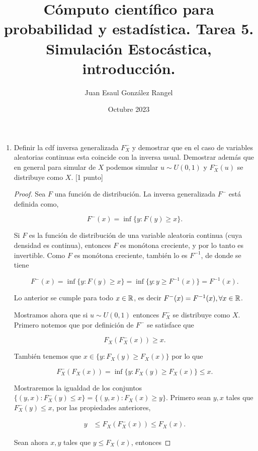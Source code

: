 \documentclass{article}
\title{Cómputo científico para probabilidad y estadística. Tarea 5.\\
Simulación Estocástica, introducción.}
\author{Juan Esaul González Rangel}
\date{Octubre 2023}
\begin{document}
\maketitle


\begin{enumerate}

    \item Definir la cdf inversa generalizada $F^-_X$ y demostrar que en el caso de 
    variables aleatorias continuas esta coincide con la inversa usual. Demostrar 
    además que en general para simular de $X$ podemos simular $u \sim U (0, 1)$ y 
    $F^-_X (u)$ se distribuye como $X$. [1 punto]

    \begin{proof}
        Sea $F$ una función de distribución. La inversa generalizada $F^-$ está definida como,

        \[ F^-(x) = \inf\{ y : F(y) \ge x \}.\]

        Si $F$ es la función de distribución de una variable aleatoria continua (cuya densidad
        es continua), entonces $F$ es monótona creciente, y por lo tanto es invertible. 
        Como $F$ es monótona creciente, también lo es $F^{-1}$, de donde se tiene

        \[ F^-(x) = \inf\{ y : F(y) \ge x \} = \inf\{ y : y \ge F^{-1}(x) \} = F^{-1}(x). \]

        Lo anterior se cumple para todo $x \in \mathbb R$, es decir $F^-(x)=F^{-1}(x), \forall x \in \mathbb R$.

        Mostramos ahora que si $u\sim U(0,1)$ entonces $F_X^-$ se distribuye como $X$. Primero 
        notemos que por definición de $F^-$ se satisface que 

        \[ F_X(F_X^-(x)) \ge x. \]

        También tenemos que $x \in \{ y : F_X(y) \ge F_X(x) \}$ por lo que

        \[ F^-_X(F_X(x)) = \inf \{ y : F_X(y) \ge F_X(x) \} \le x. \]

        Mostraremos la igualdad de los conjuntos $\{(y,x) : F_X^-(y) \le x\} = \{ (y,x) : F_X(x) \ge y\}$.
        Primero sean $y,x$ tales que $F_X^-(y) \le x$, por las propiedades anteriores,

        \begin{align*}
            y &\le F_X( F_X^-(x) ) \le F_X(x).
        \end{align*}

        Sean ahora $x,y$ tales que $y \le F_X(x)$, entonces


\end{proof}
\end{enumerate}
\end{document}
